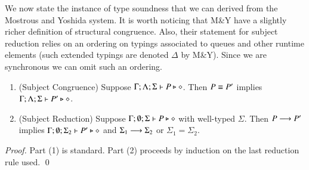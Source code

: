 We now state the instance of type soundness that we can derived from the Mostrous and Yoshida system.
It is worth noticing that M\&Y have a slightly richer definition of structural congruence.
Also, their statement for subject reduction relies on an ordering on typings associated to queues and other 
runtime elements (such extended typings are denoted $\Delta$ by M\&Y).
Since we are synchronous we can omit such an ordering.

\begin{theorem}\label{t:sr}
	\begin{enumerate}[1.]
		\item	(Subject Congruence) Suppose $\Gamma; \Lambda; \Sigma \vdash P \triangleright \diamond$.
			Then $P \equiv P'$ implies $\Gamma; \Lambda; \Sigma \vdash P' \triangleright \diamond$.

		\item	(Subject Reduction) Suppose $\Gamma; \emptyset; \Sigma \vdash P \triangleright \diamond$
			with
			well-typed $\Sigma$.
			Then $P \longrightarrow P'$ implies $\Gamma; \emptyset; \Sigma_2  \vdash P' \triangleright \diamond$
			and $\Sigma_1 \longrightarrow \Sigma_2$ or $\Sigma_1 = \Sigma_2$.
	\end{enumerate}
\end{theorem}

\begin{proof}
Part (1) is standard. Part (2) proceeds by induction on the last reduction rule used.
\qed
\end{proof}
	
